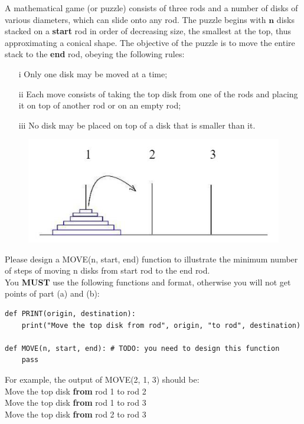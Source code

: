 \noindent {} 
A mathematical game (or puzzle) consists of three rods and a number of disks of various diameters, which can slide onto any rod. The puzzle begins with $\textbf{n}$ disks stacked on a \textbf{start} rod in order of decreasing size, the smallest at the top, thus approximating a conical shape. The objective of the puzzle is to move the entire stack to the \textbf{end} rod, obeying the following rules:
\begin{enumerate}
    \item[i] Only one disk may be moved at a time;
    \item[ii] Each move consists of taking the top disk from one of the rods and placing it on top of another rod or on an empty rod;
    \item[iii] No disk may be placed on top of a disk that is smaller than it.
\end{enumerate}
\begin{figure}[!h]
    \centering
    \includegraphics[width=0.4\linewidth]{HWs/HW3/HW03_03.jpg}
\end{figure}
Please design a MOVE(n, start, end) function to illustrate the minimum number of steps of moving n disks from start rod to the end rod. \\
You \textbf{MUST} use the following functions and format, otherwise you will not get points of part (a) and (b): 
\begin{verbatim}
def PRINT(origin, destination):
    print("Move the top disk from rod", origin, "to rod", destination)

def MOVE(n, start, end): # TODO: you need to design this function
    pass
\end{verbatim}
For example, the output of MOVE(2, 1, 3) should be: \\
Move the top disk \textbf{from} rod 1 to rod 2 \\
Move the top disk \textbf{from} rod 1 to rod 3 \\
Move the top disk \textbf{from} rod 2 to rod 3 
